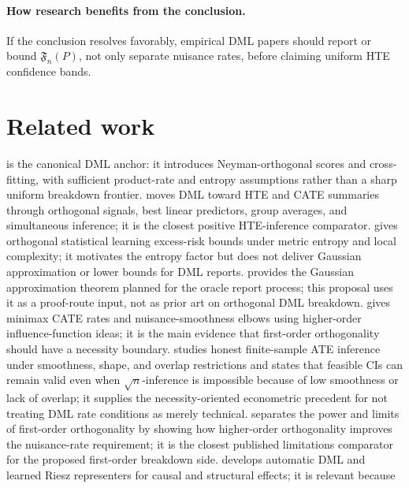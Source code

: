\documentclass[11pt]{article}
\theoremstyle{definition}
\theoremstyle{plain}
\theoremstyle{remark}
\begin{document}
\paragraph{How research benefits from the conclusion.}
If the conclusion resolves favorably, empirical DML papers should report or
bound \(\mathfrak{F}_n(P)\), not only separate nuisance rates, before claiming
uniform HTE confidence bands.

\section{Related work}
\citet{ChernozhukovEtAl2018DML} is the canonical DML anchor: it introduces
Neyman-orthogonal scores and cross-fitting, with sufficient product-rate and
entropy assumptions rather than a sharp uniform breakdown frontier.
\citet{SemenovaChernozhukov2021DMLCATE} moves DML toward HTE and CATE summaries
through orthogonal signals, best linear predictors, group averages, and
simultaneous inference; it is the closest positive HTE-inference comparator.
\citet{FosterSyrgkanis2023OSL} gives orthogonal statistical learning excess-risk
bounds under metric entropy and local complexity; it motivates the entropy
factor but does not deliver Gaussian approximation or lower bounds for DML
reports.
\citet{ChernozhukovChetverikovKato2014Gaussian} provides the Gaussian
approximation theorem planned for the oracle report process; this proposal uses
it as a proof-route input, not as prior art on orthogonal DML breakdown.
\citet{KennedyBalakrishnanRobinsWasserman2024MinimaxCATE} gives minimax CATE
rates and nuisance-smoothness elbows using higher-order influence-function
ideas; it is the main evidence that first-order orthogonality should have a
necessity boundary.
\citet[abstract and pp.~1141--1142]{ArmstrongKolesar2021FiniteSampleATE}
studies honest finite-sample ATE inference under smoothness, shape, and overlap
restrictions and states that feasible CIs can remain valid even when
\(\sqrt n\)-inference is impossible because of low smoothness or lack of
overlap; it supplies the necessity-oriented econometric precedent for not
treating DML rate conditions as merely technical.
\citet[abstract]{MackeySyrgkanisZadik2018OML} separates the power and limits of
first-order orthogonality by showing how higher-order orthogonality improves the
nuisance-rate requirement; it is the closest published limitations comparator
for the proposed first-order breakdown side.
\citet{ChernozhukovNeweySingh2022AutoDML} develops automatic DML and learned
Riesz representers for causal and structural effects; it is relevant because
\end{document}
